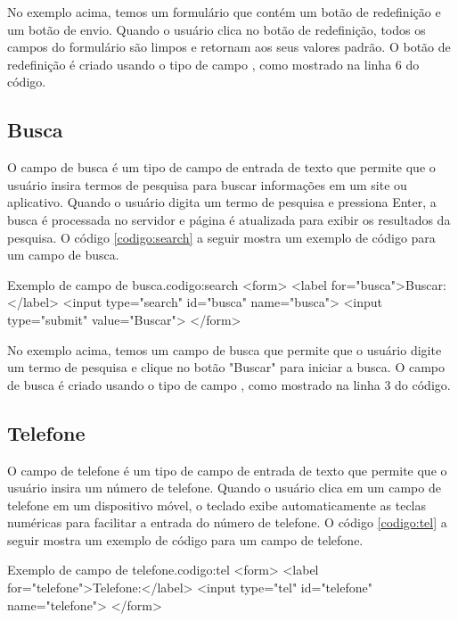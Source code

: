 No exemplo acima, temos um formulário que contém um botão de redefinição e um botão de envio. Quando o usuário clica no botão de redefinição, todos os campos do formulário são limpos e retornam aos seus valores padrão. O botão de redefinição é criado usando o tipo de campo , como mostrado na linha 6 do código.

\subsection{Busca}

O campo de busca é um tipo de campo de entrada de texto que permite que o usuário insira termos de pesquisa para buscar informações em um site ou aplicativo. Quando o usuário digita um termo de pesquisa e pressiona Enter, a busca é processada no servidor e página é atualizada para exibir os resultados da pesquisa. O código \ref{codigo:search} a seguir mostra um exemplo de código para um campo de busca.

\begin{htmlcode}{Exemplo de campo de busca.}{codigo:search}
<form>
   <label for="busca">Buscar:</label>
   <input type="search" id="busca" name="busca">
   <input type="submit" value="Buscar">
</form>
\end{htmlcode}

No exemplo acima, temos um campo de busca que permite que o usuário digite um termo de pesquisa e clique no botão "Buscar" para iniciar a busca. O campo de busca é criado usando o tipo de campo , como mostrado na linha 3 do código.

\subsection{Telefone}

O campo de telefone é um tipo de campo de entrada de texto que permite que o usuário insira um número de telefone. Quando o usuário clica em um campo de telefone em um dispositivo móvel, o teclado exibe automaticamente as teclas numéricas para facilitar a entrada do número de telefone. O código \ref{codigo:tel} a seguir mostra um exemplo de código para um campo de telefone.

\begin{htmlcode}{Exemplo de campo de telefone.}{codigo:tel}
<form>
   <label for="telefone">Telefone:</label>
   <input type="tel" id="telefone" name="telefone">
</form>
\end{htmlcode}

